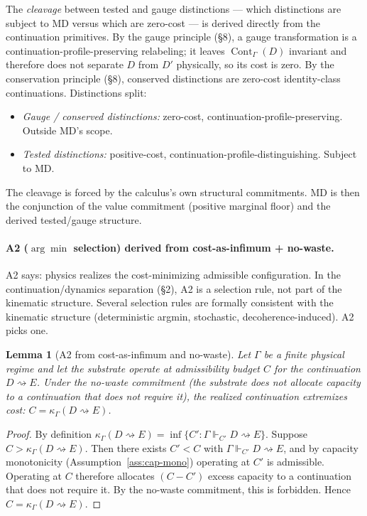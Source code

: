 \documentclass[11pt]{article}
\newtheorem{lemma}[theorem]{Lemma}
\theoremstyle{remark}
\newcommand{\G}{\Gamma}
\newcommand{\entails}{\Vdash}
\newcommand{\goes}{\rightsquigarrow}
\newcommand{\Cont}{\operatorname{Cont}}
\newcommand{\Cost}{\kappa}
\begin{document}
The \emph{cleavage} between tested and gauge distinctions --- which distinctions are subject to MD versus which are zero-cost --- is derived directly from the continuation primitives.  By the gauge principle (\S 8), a gauge transformation is a continuation-profile-preserving relabeling; it leaves $\Cont_\G(D)$ invariant and therefore does not separate $D$ from $D'$ physically, so its cost is zero.  By the conservation principle (\S 8), conserved distinctions are zero-cost identity-class continuations.  Distinctions split:
\begin{itemize}
\item \emph{Gauge / conserved distinctions:} zero-cost, continuation-profile-preserving.  Outside MD's scope.
\item \emph{Tested distinctions:} positive-cost, continuation-profile-distinguishing.  Subject to MD.
\end{itemize}
The cleavage is forced by the calculus's own structural commitments.  MD is then the conjunction of the value commitment (positive marginal floor) and the derived tested/gauge structure.

\paragraph{A2 ($\arg\min$ selection) derived from cost-as-infimum + no-waste.}

A2 says: physics realizes the cost-minimizing admissible configuration.  In the continuation/dynamics separation (\S 2), A2 is a selection rule, not part of the kinematic structure.  Several selection rules are formally consistent with the kinematic structure (deterministic argmin, stochastic, decoherence-induced).  A2 picks one.

\begin{lemma}[A2 from cost-as-infimum and no-waste]\label{lem:a2}
Let $\G$ be a finite physical regime and let the substrate operate at admissibility budget $C$ for the continuation $D \goes E$.  Under the no-waste commitment (the substrate does not allocate capacity to a continuation that does not require it), the realized continuation extremizes cost: $C = \Cost_\G(D \goes E)$.
\end{lemma}
\begin{proof}
By definition $\Cost_\G(D \goes E) = \inf\{C' : \G \entails_{C'} D \goes E\}$.  Suppose $C > \Cost_\G(D \goes E)$.  Then there exists $C' < C$ with $\G \entails_{C'} D \goes E$, and by capacity monotonicity (Assumption~\ref{ass:cap-mono}) operating at $C'$ is admissible.  Operating at $C$ therefore allocates $(C - C')$ excess capacity to a continuation that does not require it.  By the no-waste commitment, this is forbidden.  Hence $C = \Cost_\G(D \goes E)$.
\end{proof}
\end{document}

